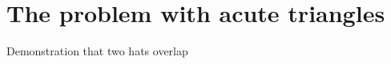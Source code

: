 \documentclass[a4paper,style=print,bibliography=totoc,nexus,lnum,extramargin]{tubsbook}
\begin{document}
%
%
%
%
%
%
%

%
%

\section{The problem with acute triangles}

Demonstration that two hats overlap
\end{document}
